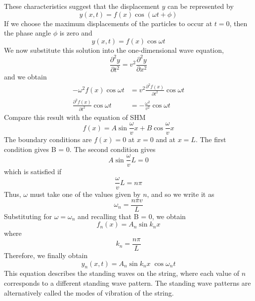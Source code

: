 \documentclass[../../../main.tex]{subfiles}
\begin{document}
These characteristics suggest that the displacement $y$ can be represented by
\begin{equation*}
    y(x, t) = f (x) \cos(\omega t + \phi)
\end{equation*}
If we choose the maximum displacements of the particles to occur at  $t = 0$, then the phase angle $\phi$ is zero and 
\begin{equation*}
    y(x, t) = f (x) \cos\omega t
\end{equation*}
We now substitute this solution into the one-dimensional wave equation,
\begin{equation*}
    \frac{\partial^2 y}{\partial t^2}= v^2 \frac{\partial^2 y}{\partial x^2}
\end{equation*}
and we obtain
\begin{align*}
    -\omega^2f (x) \cos \omega t&=v^2\frac{\partial^2 f(x)}{\partial t^2}\cos \omega t\\
    \frac{\partial^2 f(x)}{\partial t^2}\cos \omega t&=-\frac{\omega^2}{v^2}\cos \omega t
\end{align*}
Compare this result with the equation of SHM
\begin{equation*}
    f(x)=A\sin \frac{\omega}{v}x+B\cos \frac{\omega}{v}x
\end{equation*}
The boundary conditions are $f (x) = 0$ at $x = 0$ and at $x = L$. The ﬁrst  condition gives B = 0. The second condition gives
\begin{equation*}
    A\sin \frac{\omega}{v}L=0
\end{equation*}
which is satisﬁed if
\begin{equation*}
    \frac{\omega}{v}L=n\pi
\end{equation*}
Thus, $\omega $ must take one of the values given by $n$, and so we write it as
\begin{equation*}
    \omega_n=\frac{n\pi v}{L}
\end{equation*}
Substituting for $\omega = \omega_n$ and recalling that B = 0, we obtain
\begin{equation*}
    f_n(x) = A_n \sin k_nx
\end{equation*}
where 
\begin{equation*}
    k_n=\frac{n\pi}{L}
\end{equation*}
Therefore, we ﬁnally obtain
\begin{equation*}
    y_n(x, t) = A_n \sin k_n x\;\cos \omega_n t
\end{equation*}
This equation describes the standing waves on the string, where each value of  $n$ corresponds to a different standing wave pattern. The standing wave patterns  are alternatively called the modes of vibration of the string.
\end{document}
